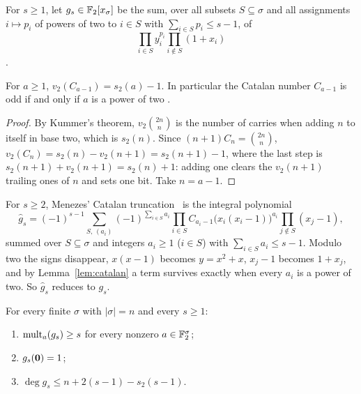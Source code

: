 \begin{definition}\label{def:truncated}
For \(s\ge1\), let \(g_s\in\mathbb F_2[x_\sigma]\) be the sum, over all subsets
\(S\subseteq\sigma\) and all assignments \(i\mapsto p_i\) of powers of two to
\(i\in S\) with \(\sum_{i\in S}p_i\le s-1\), of
\[
 \prod_{i\in S}y_i^{p_i}\prod_{i\notin S}(1+x_i)
\]
.
\end{definition}

\begin{lemma}\label{lem:catalan}
For \(a\ge1\), \(v_2(C_{a-1})=s_2(a)-1\). In particular the Catalan number
\(C_{a-1}\) is odd if and only if \(a\) is a power of two
.
\end{lemma}

\begin{proof}
By Kummer's theorem, \(v_2\binom{2n}{n}\) is the number of carries when adding \(n\)
to itself in base two, which is \(s_2(n)\). Since \((n+1)C_n=\binom{2n}{n}\),
\(v_2(C_n)=s_2(n)-v_2(n+1)=s_2(n+1)-1\), where the last step is
\(s_2(n+1)+v_2(n+1)=s_2(n)+1\): adding one clears the \(v_2(n+1)\) trailing ones of
\(n\) and sets one bit. Take \(n=a-1\).
\end{proof}

For \(s\ge2\), Menezes' Catalan truncation~\cite[equation~(12)]{Men26} is the
integral polynomial
\[
 \widehat g_s=(-1)^{s-1}\sum_{S,\,(a_i)}(-1)^{\sum_{i\in S}a_i}
 \prod_{i\in S}C_{a_i-1}\bigl(x_i(x_i-1)\bigr)^{a_i}\prod_{j\notin S}(x_j-1),
\]
summed over \(S\subseteq\sigma\) and integers \(a_i\ge1\) (\(i\in S\)) with
\(\sum_{i\in S}a_i\le s-1\). Modulo two the signs disappear, \(x(x-1)\) becomes
\(y=x^2+x\), \(x_j-1\) becomes \(1+x_j\), and by Lemma~\ref{lem:catalan} a term
survives exactly when every \(a_i\) is a power of two. So \(\widehat g_s\) reduces
to \(g_s\).

\begin{theorem}\label{thm:truncated-product}
For every finite \(\sigma\) with \(|\sigma|=n\) and every \(s\ge1\):
\begin{enumerate}
 \item \(\operatorname{mult}_a(g_s)\ge s\) for every nonzero \(a\in\mathbb F_2^\sigma\);
 \item \(g_s(\mathbf 0)=1\);
 \item \(\deg g_s\le n+2(s-1)-s_2(s-1)\).
\end{enumerate}
\end{theorem}

